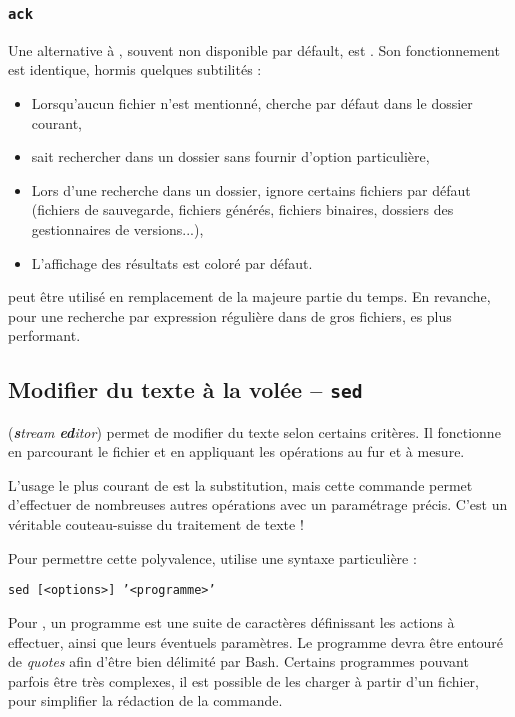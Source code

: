 \subsubsection{\texttt{ack}}
Une alternative à , souvent non disponible par défault, est . Son fonctionnement est identique, hormis quelques subtilités :
\begin{itemize}
    \item Lorsqu'aucun fichier n'est mentionné,  cherche par défaut dans le dossier courant,
    \item {} sait rechercher dans un dossier sans fournir d'option particulière,
    \item Lors d'une recherche dans un dossier,  ignore certains fichiers par défaut (fichiers de sauvegarde, fichiers générés, fichiers binaires, dossiers des gestionnaires de versions...),
    \item L'affichage des résultats est coloré par défaut.
\end{itemize}


 peut être utilisé en remplacement de  la majeure partie du temps. En revanche, pour une recherche par expression régulière dans de gros fichiers,  es plus performant.


\newpage
\subsection{Modifier du texte à la volée -- \texttt{sed}} 
 (\textit{\textbf{s}tream \textbf{ed}itor}) permet de modifier du texte selon certains critères. Il fonctionne en parcourant le fichier et en appliquant les opérations au fur et à mesure.

L'usage le plus courant de  est la substitution, mais cette commande permet d'effectuer de nombreuses autres opérations avec un paramétrage précis. C'est un véritable couteau-suisse du traitement de texte !

Pour permettre cette polyvalence,  utilise une syntaxe particulière : 
\begin{nscenter}
\texttt{sed [<options>] '<programme>'}
\end{nscenter}
Pour , un programme est une suite de caractères définissant les actions à effectuer, ainsi que leurs éventuels paramètres. Le programme devra être entouré de \textit{quotes} afin d'être bien délimité par Bash. Certains programmes pouvant parfois être très complexes, il est possible de les charger à partir d'un fichier, pour simplifier la rédaction de la commande.

